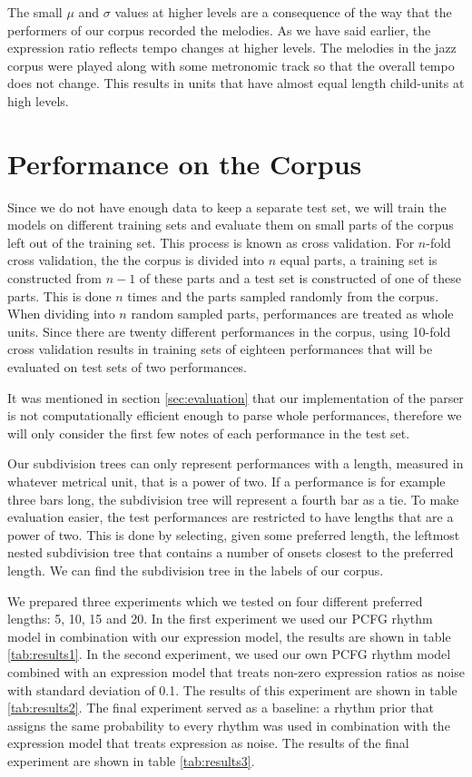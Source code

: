 The small $\mu$ and $\sigma$ values at higher levels are a consequence of the way that the performers of our corpus recorded the melodies. As we have said earlier, the expression ratio reflects tempo changes at higher levels. The melodies in the jazz corpus were played along with some metronomic track so that the overall tempo does not change. This results in units that have almost equal length child-units at high levels.

\section{Performance on the Corpus}

Since we do not have enough data to keep a separate test set, we will train the models on different training sets and evaluate them on small parts of the corpus left out of the training set. This process is known as cross validation. For $n$-fold cross validation, the the corpus is divided into $n$ equal parts, a training set is constructed from $n-1$ of these parts and a test set is constructed of one of these parts. This is done $n$ times and the parts sampled randomly from the corpus. When dividing into $n$ random sampled parts, performances are treated as whole units. Since there are twenty different performances in the corpus, using 10-fold cross validation results in training sets of eighteen performances that will be evaluated on test sets of two performances.

It was mentioned in section \ref{sec:evaluation} that our implementation of the parser is not computationally efficient enough to parse whole performances, therefore we will only consider the first few notes of each performance in the test set. 

Our subdivision trees can only represent performances with a length, measured in whatever metrical unit, that is a power of two. If a performance is for example three bars long, the subdivision tree will represent a fourth bar as a tie. To make evaluation easier, the test performances are restricted to have lengths that are a power of two. This is done by selecting, given some preferred length, the leftmost nested subdivision tree that contains a number of onsets closest to the preferred length. We can find the subdivision tree in the labels of our corpus.

We prepared three experiments which we tested on four different preferred lengths: 5, 10, 15 and 20. In the first experiment we used our PCFG rhythm model in combination with our expression model, the results are shown in table \ref{tab:results1}. In the second experiment, we used our own PCFG rhythm model combined with an expression model that treats non-zero expression ratios as noise with standard deviation of 0.1. The results of this experiment are shown in table \ref{tab:results2}. The final experiment served as a baseline: a rhythm prior that assigns the same probability to every rhythm was used in combination with the expression model that treats expression as noise. The results of the final experiment are shown in table \ref{tab:results3}.


